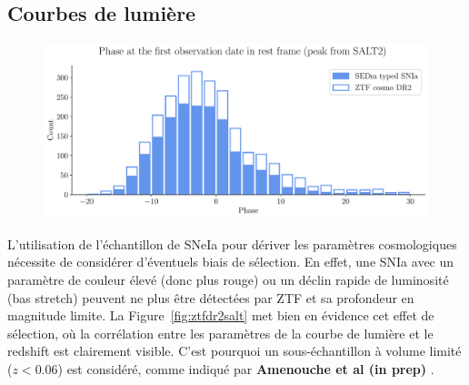 \documentclass[../main/main.tex]{subfiles}
\begin{document}
\subsection{Courbes de lumière}


\begin{figure}[ht]
  \centering
  \includegraphics[width=1\textwidth]{../figures/09_dr2/phaseIadr2.pdf}
  \caption[]{}
  \label{fig:phaseIa}
\end{figure}


L'utilisation de l'échantillon de SNeIa pour dériver les paramètres
cosmologiques nécessite de considérer d'éventuels biais de sélection. En
effet, une SNIa avec un paramètre de couleur élevé (donc plus rouge) ou
un déclin rapide de luminosité (bas stretch) peuvent ne plus être détectées
par ZTF et sa profondeur en magnitude limite. La
Figure~\ref{fig:ztfdr2salt} met bien en évidence cet effet de sélection,
où la corrélation entre les paramètres de la courbe de lumière et le
redshift est clairement visible. C'est pourquoi un sous-échantillon à
volume limité ($z<0.06$) est considéré, comme indiqué par \textbf{Amenouche et al (in prep)} .
\end{document}
